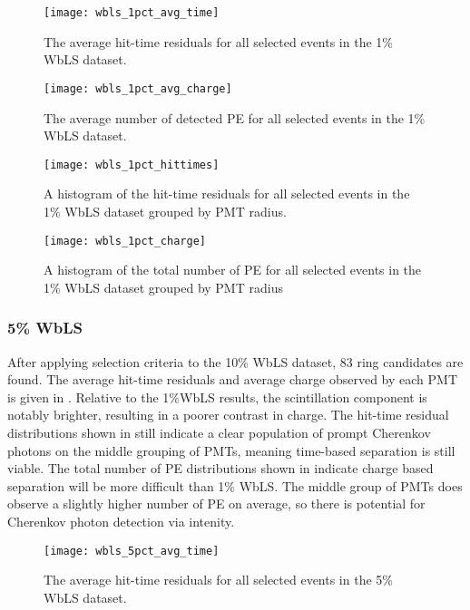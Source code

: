 \begin{figure}
\centering
\texttt{[image: wbls\_1pct\_avg\_time]}
\caption{\label{fig:wbls1pct_avg_time}The average hit-time residuals for all selected events in the 1\% WbLS dataset.}
\end{figure}

\begin{figure}
\centering
\texttt{[image: wbls\_1pct\_avg\_charge]}
\caption{\label{fig:wbls1pct_avg_charge}The average number of detected PE for all selected events in the 1\% WbLS dataset.}
\end{figure}

\begin{figure}
\centering
\texttt{[image: wbls\_1pct\_hittimes]}
\caption{\label{fig:wbls1pct_tresid}A histogram of the hit-time residuals for all selected events in the 1\% WbLS dataset grouped by PMT radius.}
\end{figure}

\begin{figure}
\centering
\texttt{[image: wbls\_1pct\_charge]}
\caption{\label{fig:wbls1pct_totalq}A histogram of the total number of PE for all selected events in the 1\% WbLS dataset grouped by PMT radius}
\end{figure}

\clearpage

\subsubsection{5\% WbLS}

After applying selection criteria to the 10\% WbLS dataset, 83 ring candidates are found.
The average hit-time residuals and average charge observed by each PMT is given in .
Relative to the 1\%WbLS results, the scintillation component is notably brighter, resulting in a poorer contrast in charge.
The hit-time residual distributions shown in  still indicate a clear population of prompt Cherenkov photons on the middle grouping of PMTs, meaning time-based separation is still viable.
The total number of PE distributions shown in  indicate charge based separation will be more difficult than 1\% WbLS.
The middle group of PMTs does observe a slightly higher number of PE on average, so there is potential for Cherenkov photon detection via intenity.

\begin{figure}
\centering
\texttt{[image: wbls\_5pct\_avg\_time]}
\caption{\label{fig:wbls5pct_avg_time}The average hit-time residuals for all selected events in the 5\% WbLS dataset.}
\end{figure}

